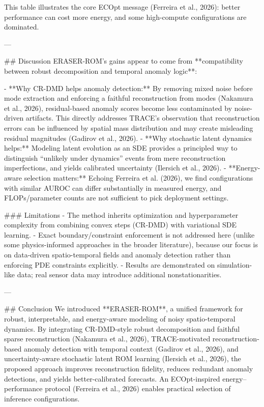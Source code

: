 This table illustrates the core ECOpt message (Ferreira et al., 2026): better performance can cost more energy, and some high-compute configurations are dominated.

---

## Discussion  
ERASER-ROM’s gains appear to come from **compatibility between robust decomposition and temporal anomaly logic**:

- **Why CR-DMD helps anomaly detection:** By removing mixed noise before mode extraction and enforcing a faithful reconstruction from modes (Nakamura et al., 2026), residual-based anomaly scores become less contaminated by noise-driven artifacts. This directly addresses TRACE’s observation that reconstruction errors can be influenced by spatial mass distribution and may create misleading residual magnitudes (Gadirov et al., 2026).  
- **Why stochastic latent dynamics helps:** Modeling latent evolution as an SDE provides a principled way to distinguish “unlikely under dynamics” events from mere reconstruction imperfections, and yields calibrated uncertainty (Ilersich et al., 2026).  
- **Energy-aware selection matters:** Echoing Ferreira et al. (2026), we find configurations with similar AUROC can differ substantially in measured energy, and FLOPs/parameter counts are not sufficient to pick deployment settings.

### Limitations  
- The method inherits optimization and hyperparameter complexity from combining convex steps (CR-DMD) with variational SDE learning.  
- Exact boundary/constraint enforcement is not addressed here (unlike some physics-informed approaches in the broader literature), because our focus is on data-driven spatio-temporal fields and anomaly detection rather than enforcing PDE constraints explicitly.  
- Results are demonstrated on simulation-like data; real sensor data may introduce additional nonstationarities.

---

## Conclusion  
We introduced **ERASER-ROM**, a unified framework for robust, interpretable, and energy-aware modeling of noisy spatio-temporal dynamics. By integrating CR-DMD-style robust decomposition and faithful sparse reconstruction (Nakamura et al., 2026), TRACE-motivated reconstruction-based anomaly detection with temporal context (Gadirov et al., 2026), and uncertainty-aware stochastic latent ROM learning (Ilersich et al., 2026), the proposed approach improves reconstruction fidelity, reduces redundant anomaly detections, and yields better-calibrated forecasts. An ECOpt-inspired energy–performance protocol (Ferreira et al., 2026) enables practical selection of inference configurations.

